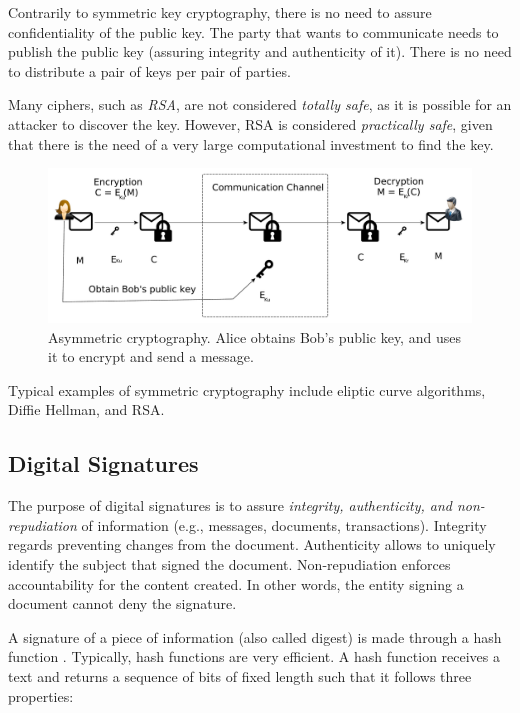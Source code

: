 \documentclass[12pt,a4paper]{article}
\theoremstyle{definition}
\begin{document}
Contrarily to symmetric key cryptography, there is no need to assure confidentiality of the public key. The party that wants to communicate needs to publish the public key (assuring integrity and authenticity of it). There is no need to distribute a pair of keys per pair of parties.

Many ciphers, such as \emph{RSA}, are not considered \emph{totally safe}, as it is possible for an attacker to discover the key. However, RSA is considered \emph{practically safe}, given that there is the need of a very large computational investment to find the key. 

\begin{figure}[h]
    \centering
    \includegraphics[scale=0.4]{figures/lab2_pc.pdf}
    \caption{Asymmetric cryptography. Alice obtains Bob's public key, and uses it to encrypt and send a message.}
    \label{fig:pc}
\end{figure}

Typical examples of symmetric cryptography include eliptic curve algorithms, Diffie Hellman, and RSA.

\subsection{Digital Signatures}
The purpose of digital signatures is to assure \emph{integrity, authenticity, and non-repudiation} of information (e.g., messages, documents, transactions). Integrity regards preventing changes from the document. Authenticity allows to uniquely identify the subject that signed the document. Non-repudiation enforces accountability for the content created. In other words, the entity signing a document cannot deny the signature. 

A signature of a piece of information (also called digest) is made through a hash function \cite{rogaway2004}. Typically, hash functions are very efficient. A hash function receives a text and returns a sequence of bits of fixed length such that it follows three properties:
\end{document}
